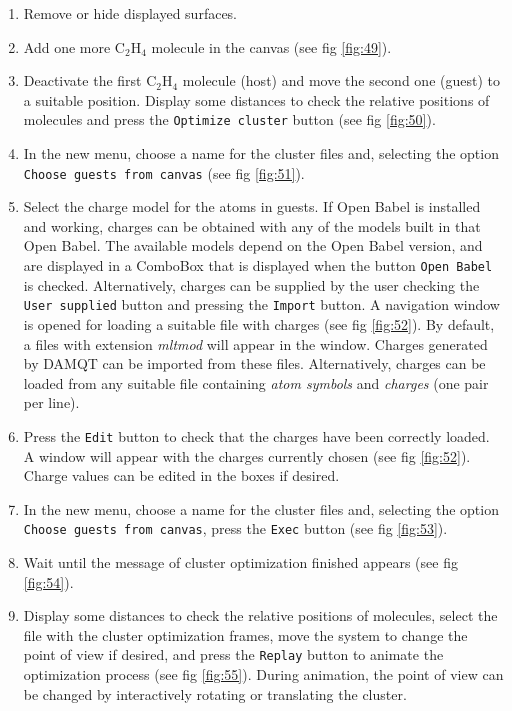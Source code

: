 \documentclass[a4paper,10pt]{article}
\begin{document}
\begin{enumerate}

\item Remove or hide displayed surfaces. 

\item Add one more C$_2$H$_4$ molecule in the canvas (see fig \ref{fig:49}).

\item Deactivate the first C$_2$H$_4$ molecule (host) and move the second one (guest) to a 
suitable position. Display some distances to check the relative positions of molecules
and press the \texttt{Optimize cluster} button
(see fig \ref{fig:50}).

\item In the new menu, choose a name for the cluster files and, selecting the option
\texttt{Choose guests from canvas} (see fig \ref{fig:51}).

\item Select the charge model for the atoms in guests. If Open Babel is 
installed and working, charges can be obtained with any of the models 
built in that Open Babel. The available models depend on the Open Babel
version, and are displayed in a ComboBox that is displayed when the button 
\texttt{Open  Babel} is checked. Alternatively, charges can be
supplied by the user checking the \texttt{User supplied} button 
and pressing the \texttt{Import} button. A navigation window is opened for 
loading a suitable file with charges (see fig \ref{fig:52}). By default, a 
files with extension {\it mltmod} will appear in the window. 
Charges generated by DAMQT can be imported from these files. 
Alternatively, charges can be loaded from any suitable file
containing {\it atom symbols} and 
{\it charges} (one pair per line).

\item Press the \texttt{Edit} button to check that the charges have been
correctly loaded. A window will appear with the charges currently chosen
(see fig \ref{fig:52}). Charge values can be edited in the boxes if 
desired.


\item In the new menu, choose a name for the cluster files and, selecting the option
\texttt{Choose guests from canvas}, press the \texttt{Exec} button (see fig \ref{fig:53}).

\item Wait until the message of cluster optimization finished appears (see fig \ref{fig:54}).

\item Display some distances to check the relative positions of molecules, select the file with
the cluster optimization frames, move the system to change the point of view if desired,
and press the \texttt{Replay} button to animate the optimization process (see fig \ref{fig:55}). 
During animation, the point of view can be changed by interactively rotating or translating the cluster.


\end{enumerate}
\end{document}
